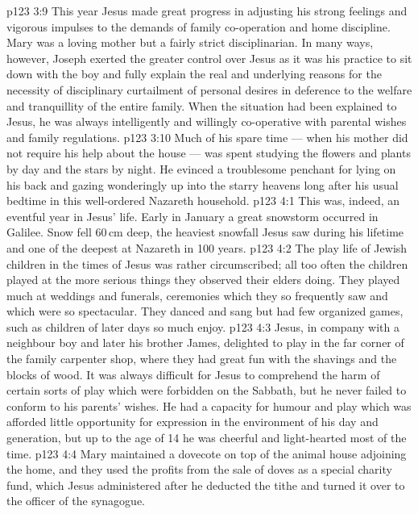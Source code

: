 \vs p123 3:9 \pc This year Jesus made great progress in adjusting his strong feelings and vigorous impulses to the demands of family co\hyp{}operation and home discipline. Mary was a loving mother but a fairly strict disciplinarian. In many ways, however, Joseph exerted the greater control over Jesus as it was his practice to sit down with the boy and fully explain the real and underlying reasons for the necessity of disciplinary curtailment of personal desires in deference to the welfare and tranquillity of the entire family. When the situation had been explained to Jesus, he was always intelligently and willingly co\hyp{}operative with parental wishes and family regulations.
\vs p123 3:10 \pc Much of his spare time --- when his mother did not require his help about the house --- was spent studying the flowers and plants by day and the stars by night. He evinced a troublesome penchant for lying on his back and gazing wonderingly up into the starry heavens long after his usual bedtime in this well\hyp{}ordered Nazareth household.
\vs p123 4:1 This was, indeed, an eventful year in Jesus’ life. Early in January a great snowstorm occurred in Galilee. Snow fell 60\,cm deep, the heaviest snowfall Jesus saw during his lifetime and one of the deepest at Nazareth in 100 years.
\vs p123 4:2 The play life of Jewish children in the times of Jesus was rather circumscribed; all too often the children played at the more serious things they observed their elders doing. They played much at weddings and funerals, ceremonies which they so frequently saw and which were so spectacular. They danced and sang but had few organized games, such as children of later days so much enjoy.
\vs p123 4:3 Jesus, in company with a neighbour boy and later his brother James, delighted to play in the far corner of the family carpenter shop, where they had great fun with the shavings and the blocks of wood. It was always difficult for Jesus to comprehend the harm of certain sorts of play which were forbidden on the Sabbath, but he never failed to conform to his parents’ wishes. He had a capacity for humour and play which was afforded little opportunity for expression in the environment of his day and generation, but up to the age of 14 he was cheerful and light\hyp{}hearted most of the time.
\vs p123 4:4 Mary maintained a dovecote on top of the animal house adjoining the home, and they used the profits from the sale of doves as a special charity fund, which Jesus administered after he deducted the tithe and turned it over to the officer of the synagogue.
